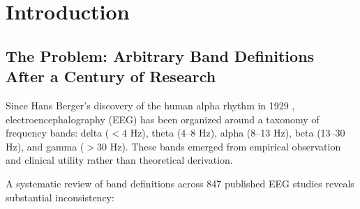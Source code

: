 \documentclass[11pt,a4paper]{article}
\newcommand{\phisym}{\varphi}
\newcommand{\fzero}{f_0}
\begin{document}
\begin{abstract}
\textbf{Conclusions.} Human EEG frequency organization follows golden ratio architecture, with \textbf{ratios---not absolute frequencies---as the deep invariant}. Gamma's uniquely strong $\phisym^n$ adherence is functionally required for binding operations; lower-frequency bands implement the same architecture with looser constraints appropriate to their computational roles. The correspondence between neural $\fzero$ and Schumann Resonance ($\sim$7.5 Hz) may reflect \textbf{biophysical convergence via evolutionary optimization}: independent tuning of GABA receptor kinetics, membrane time constants, and thalamocortical conduction delays produces $\phisym^n$ ratio relationships as an emergent property---a potentially more parsimonious explanation than direct SR coupling. The $\phisym^n$ architecture may represent a \textbf{universal solution} that any sufficiently complex neural system would discover, balancing segregation (anti-mode-locking) and integration (Fibonacci coupling) through the golden ratio's unique mathematical properties.

\vspace{0.3cm}
\textbf{Keywords:} EEG, frequency bands, golden ratio, Schumann Resonance, neural oscillations, spectral architecture, FOOOF, gamma binding, evolutionary optimization, coupled oscillators
\end{abstract}

\newpage
\tableofcontents
\newpage

\section{Introduction}

\subsection{The Problem: Arbitrary Band Definitions After a Century of Research}

Since Hans Berger's discovery of the human alpha rhythm in 1929 \citep{berger1929}, electroencephalography (EEG) has been organized around a taxonomy of frequency bands: delta ($<4$ Hz), theta (4--8 Hz), alpha (8--13 Hz), beta (13--30 Hz), and gamma ($>30$ Hz). These bands emerged from empirical observation and clinical utility rather than theoretical derivation.

A systematic review of band definitions across 847 published EEG studies reveals substantial inconsistency:
\end{document}
